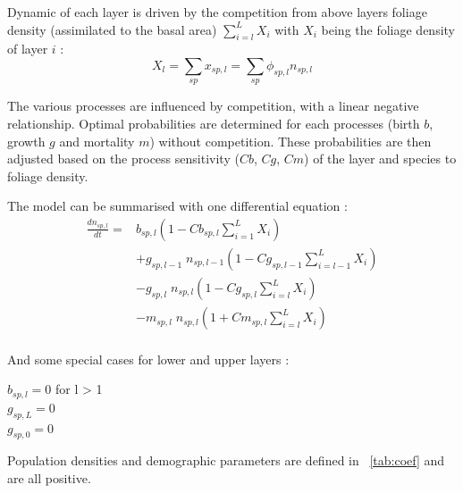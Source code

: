 \documentclass{article}
\begin{document}
Dynamic of each layer is driven by the competition from above layers foliage density (assimilated to the basal area) $\sum_{i = l}^{L} X_i$ with $X_i$ being the foliage density of layer $i$ :
\begin{equation}
    X_{l} = \sum_{sp} x_{sp,l} = \sum_{sp} \phi_{sp,l} n_{sp,l}
\end{equation}

The various processes are influenced by competition, with a linear negative relationship. Optimal probabilities are determined for each processes (birth $b$, growth $g$ and mortality $m$) without competition. These probabilities are then adjusted based on the process sensitivity ($Cb$, $Cg$, $Cm$) of the layer and species to foliage density.

\noindent The model can be summarised with one differential equation : \\
\begin{equation}\label{eq:model_general}
    \begin{split}
    \frac{dn_{sp,l}}{dt} = & 
    b_{sp,l} (1 - Cb_{sp,l} \sum_{i = 1}^{L} X_{i}) \\
    & + g_{sp,l - 1} \; n_{sp,l-1} (1 - Cg_{sp,l-1} \sum_{i = l-1}^{L} X_{i}) \\
    & - g_{sp,l} \; n_{sp,l} (1 - Cg_{sp,l} \sum_{i = l}^{L} X_{i}) \\
    & - m_{sp,l} \; n_{sp,l}(1 + Cm_{sp,l} \sum_{i = l}^{L} X_{i})
    \end{split}
\end{equation}
\\
And some special cases for lower and upper layers : \\
\begin{center}
    $b_{sp,l} = 0$ for l > 1 \\
    $g_{sp,L} = 0$ \\
    $g_{sp,0} = 0$
\end{center}

Population densities and demographic parameters are defined in ~\ref{tab:coef} and are all positive.
\end{document}

